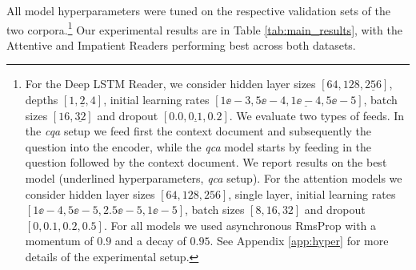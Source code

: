 \documentclass{article}
\begin{document}
 All model hyperparameters were tuned on the respective validation sets of the
 two corpora.\footnote{For the Deep LSTM Reader, we consider hidden layer sizes
   ${[64,128,\underline{256}]}$, depths ${[1,\underline{2},4]}$, initial
   learning rates ${[1\ee{-}3,5\ee{-}4,\underline{1\ee{-}4},5\ee{-}5]}$, batch
   sizes ${[16,\underline{32}]}$ and dropout $[0.0,\underline{0.1},0.2]$.  We
   evaluate two types of feeds. In the \textit{cqa} setup we feed first the
   context document and subsequently the question into the encoder, while the
   \textit{qca} model starts by feeding in the question followed by the context
   document. We report results on the best model (underlined hyperparameters,
   \textit{qca} setup).  For the attention models we consider hidden layer sizes
   $[64,128,256]$, single layer,  initial learning rates
 $[1\ee{-}4,5\ee{-}5,2.5\ee{-}5,1\ee{-}5]$, batch sizes $[8,16,32]$ and dropout
 $[0,0.1,0.2,0.5]$. For all models we used asynchronous RmsProp
 \cite{Tieleman:2012:RMSPROP} with a momentum of $0.9$ and a decay of $0.95$.
 See Appendix \ref{app:hyper} for more details of the experimental setup.}
Our experimental results are in Table \ref{tab:main_results}, with the
Attentive and Impatient Readers performing best across both datasets.
\end{document}
